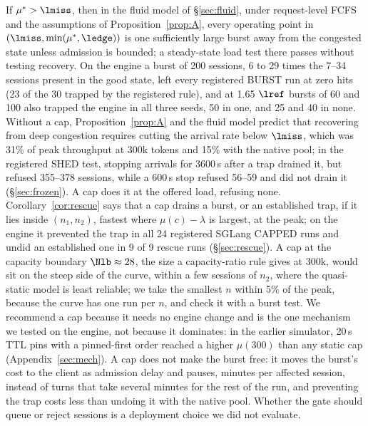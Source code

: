 If $\mu^*>\lmiss$, then in the fluid model of \S\ref{sec:fluid}, under request-level FCFS and the assumptions of Proposition~\ref{prop:A}, every operating point in $(\lmiss,\min(\mu^*,\ledge))$ is one sufficiently large burst away from the congested state unless admission is bounded; a steady-state load test there passes without testing recovery. On the engine a burst of 200 sessions, 6 to 29 times the 7--34 sessions present in the good state, left every registered BURST run at zero hits (23 of the 30 trapped by the registered rule), and at 1.65 $\lref$ bursts of 60 and 100 also trapped the engine in all three seeds, 50 in one, and 25 and 40 in none. Without a cap, Proposition~\ref{prop:A} and the fluid model predict that recovering from deep congestion requires cutting the arrival rate below $\lmiss$, which was 31\% of peak throughput at 300k tokens and 15\% with the native pool; in the registered SHED test, stopping arrivals for 3600\,s after a trap drained it, but refused 355--378 sessions, while a 600\,s stop refused 56--59 and did not drain it (\S\ref{sec:frozen}). A cap does it at the offered load, refusing none. Corollary~\ref{cor:rescue} says that a cap drains a burst, or an established trap, if it lies inside $(n_1,n_2)$, fastest where $\mu(c)-\lambda$ is largest, at the peak; on the engine it prevented the trap in all 24 registered SGLang CAPPED runs and undid an established one in 9 of 9 rescue runs (\S\ref{sec:rescue}). A cap at the capacity boundary $\Nlb\approx28$, the size a capacity-ratio rule gives at 300k, would sit on the steep side of the curve, within a few sessions of $n_2$, where the quasi-static model is least reliable; we take the smallest $n$ within 5\% of the peak, because the curve has one run per $n$, and check it with a burst test. We recommend a cap because it needs no engine change and is the one mechanism we tested on the engine, not because it dominates: in the earlier simulator, 20\,s TTL pins with a pinned-first order reached a higher $\mu(300)$ than any static cap (Appendix~\ref{sec:mech}). A cap does not make the burst free: it moves the burst's cost to the client as admission delay and pauses, minutes per affected session, instead of turns that take several minutes for the rest of the run, and preventing the trap costs less than undoing it with the native pool. Whether the gate should queue or reject sessions is a deployment choice we did not evaluate.

